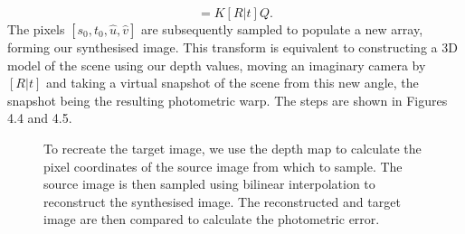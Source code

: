\begin{equation}
    [s_0, t_0, \hat{u}, \hat{v}] = K[R|t]Q. 
\end{equation}
The pixels $[s_0, t_0, \hat{u}, \hat{v}]$ are subsequently sampled to populate a new array, forming our synthesised image. This transform is equivalent to constructing a 3D model of the scene using our depth values, moving an imaginary camera by $[R|t]$ and taking a virtual snapshot of the scene from this new angle, the snapshot being the resulting photometric warp. The steps are shown in Figures 4.4 and 4.5.\\

\begin{figure}[h]

    \caption[The bilinear interpolation algorithm used for differentiable image-based rendering]{To recreate the target image, we use the depth map to calculate the pixel coordinates of the source image from which to sample. The source image is then sampled using bilinear interpolation to reconstruct the synthesised image. The reconstructed and target image are then compared to calculate the photometric error.}
\end{figure}

